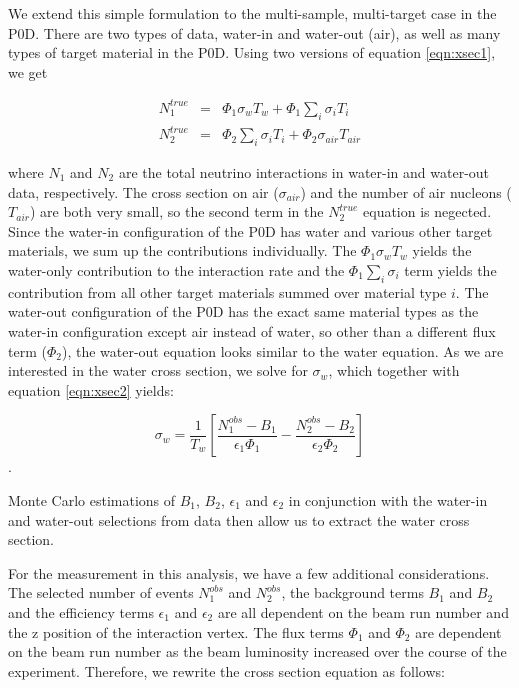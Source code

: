 We extend this simple formulation to the multi-sample, multi-target
case in the P0D. There are two types of data, water-in and water-out (air), as
well as many types of target material in the P0D. Using two versions of
equation \ref{eqn:xsec1}, we get

\begin{eqnarray}
N^{true}_1 &=& \Phi_1 \sigma_w T_w + \Phi_1 \sum\limits_{i}\sigma_i
T_i \nonumber \\
N^{true}_2 &=& \Phi_2 \sum\limits_{i}\sigma_i T_i + \Phi_2 \sigma_{air} T_{air}\nonumber
\label{eqn:xsec4}
\end{eqnarray}

\noindent where $N_1$ and $N_2$ are the total neutrino interactions in water-in
and water-out data, respectively. The cross section on air ($\sigma_{air}$) and the number of air nucleons ($T_{air}$) are both very small, so the second term in the $N^{true}_2$ equation is negected. Since the water-in configuration of the P0D
has water and various other target materials, we sum up the
contributions individually. The $\Phi_1 \sigma_w T_w$ yields the
water-only contribution to the interaction rate and the $\Phi_1
\sum\limits_{i}\sigma_i$ term yields the contribution from all other
target materials summed over material type $i$. The water-out configuration
of the P0D has the exact same material types as the water-in
configuration except air instead of water, so other than a different flux term
($\Phi_2$), the water-out equation looks similar to the water
equation. As we are interested in the water cross section, we solve
for $\sigma_w$, which together with equation \ref{eqn:xsec2} yields:

\begin{equation}
\sigma_w = \frac{1}{T_w}\left[\frac{N^{obs}_1-B_1}{\epsilon_1
    \Phi_1}-\frac{N^{obs}_2-B_2}{\epsilon_2\Phi_2}\right]
\label{eqn:xsec5}
\end{equation}.

Monte Carlo estimations of $B_1$, $B_2$, $\epsilon_1$ and $\epsilon_2$
in conjunction with the water-in and water-out selections from data then
allow us to extract the water cross section. 

For the measurement in this analysis, we have a few additional considerations. The selected number of events $N^{obs}_1$ and $N^{obs}_2$, the background terms $B_1$ and $B_2$ and the efficiency terms $\epsilon_1$ and $\epsilon_2$ are all dependent on the beam run number and the z position of the interaction vertex. The flux terms $\Phi_1$ and $\Phi_2$ are dependent on the beam run number as the beam luminosity increased over the course of the experiment. Therefore, we rewrite the cross section equation as follows:

